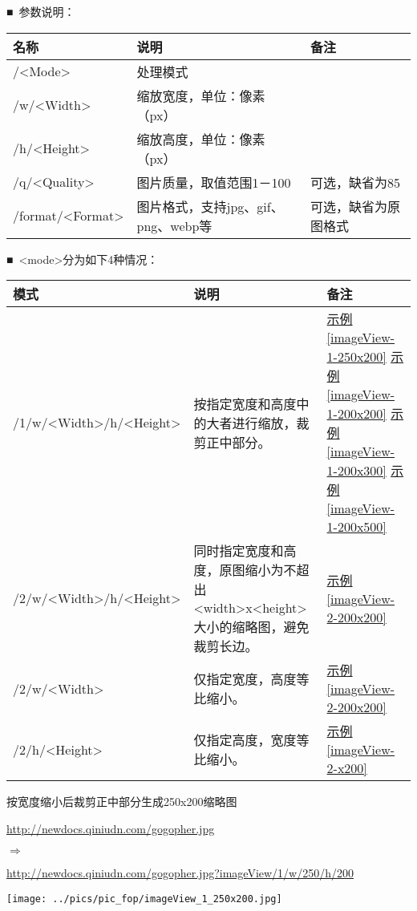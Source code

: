 \documentclass[11pt, oneside]{book}
\newcommand{\qsym}[1]{
\footnotesize
\noindent
#1\par
\normalsize
}
\newcommand{\qpara}[1]{
\vspace{0.3em}
\noindent
#1\par
\vspace{0.3em}
}
\newcommand{\qsamplelink}[1]{
\vspace{0.2em}
\noindent
#1\par
\vspace{0.1em}
}
\newcommand{\qurl}[1]{\footnotesize\url{#1}\normalsize}
\newcommand{\qtable}[1]{\footnotesize\vspace{0.5em}#1\vspace{0.5em}\normalsize}
\newcommand{\qsample}[1]{\hyperref[#1]{示例\ref*{#1}}}
\begin{document}
\qpara{■\ 参数说明：}
\qtable{
\def\arraystretch{2}
\begin{tabular}{|l|l|p{10.35em}|}
\hline
名称 & 说明 & 备注\\
\hline
/\textless Mode\textgreater & 处理模式 & \\
\hline
/w/\textless Width\textgreater & 缩放宽度，单位：像素（px） & \\
\hline
/h/\textless Height\textgreater & 缩放高度，单位：像素（px） & \\
\hline
/q/\textless Quality\textgreater & 图片质量，取值范围1－100 & 可选，缺省为85 \\
\hline
/format/\textless Format\textgreater & 图片格式，支持jpg、gif、png、webp等 & 可选，缺省为原图格式 \\
\hline
\end{tabular}
}

\qpara{■\ \textless mode\textgreater 分为如下4种情况：}
\qtable{
\def\arraystretch{2}
\begin{tabular}{|l|p{20em}|p{5em}|}
\hline
模式 & 说明 & 备注 \\
\hline
/1/w/\textless Width\textgreater /h/\textless Height\textgreater & 按指定宽度和高度中的大者进行缩放，裁剪正中部分。&  \qsample{imageView-1-250x200} \newline \qsample{imageView-1-200x200} \newline  \qsample{imageView-1-200x300} \newline \qsample{imageView-1-200x500} \\
\hline
/2/w/\textless Width\textgreater /h/\textless Height\textgreater & 同时指定宽度和高度，原图缩小为不超出\textless width\textgreater x\textless height\textgreater 大小的缩略图，避免裁剪长边。& \qsample{imageView-2-200x200} \\
\hline
/2/w/\textless Width\textgreater & 仅指定宽度，高度等比缩小。 & \qsample{imageView-2-200x200} \\
\hline
/2/h/\textless Height\textgreater & 仅指定高度，宽度等比缩小。 & \qsample{imageView-2-x200} \\
\hline
\end{tabular}
}

\clearpage

\begin{sample}
  \caption{按宽度缩小后裁剪正中部分生成250x200缩略图}
    \qsamplelink{\qurl{http://newdocs.qiniudn.com/gogopher.jpg}}
    \qsym{$\Rightarrow$}
    \qsamplelink{\qurl{http://newdocs.qiniudn.com/gogopher.jpg?imageView/1/w/250/h/200}}

    \begin{center}
      \texttt{[image: ../pics/pic\_fop/imageView\_1\_250x200.jpg]}
    \end{center}

  \label{imageView-1-250x200}
\end{sample}
\end{document}
